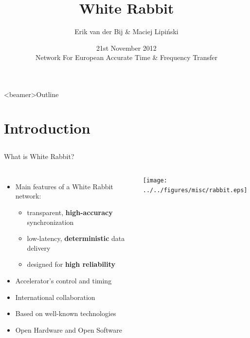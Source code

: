 \documentclass[compress,red]{beamer}
\title[White Rabbit \hspace{2em}\insertframenumber/\inserttotalframenumber]
{White Rabbit}
\institute{
   \begin{center}
    Hardware and Timing Section  \\
    CERN\\
   \end{center}
}
\author{
Erik van der Bij \& Maciej Lipi\'{n}ski \\
}
\date{21st November 2012 \\ Network For European Accurate Time \& Frequency Transfer}
\begin{document}
\frame{\titlepage}
\begin{frame}<beamer>{Outline}
    \tableofcontents %
\end{frame}

\section{Introduction}
\subsection{}
\begin{frame}{What is White Rabbit?}

\begin{columns}[c]
	  \begin{itemize}
		\item Main features of a White Rabbit network:
		\begin{itemize}
		  \item transparent,  {\bf high-accuracy} synchronization
		  \item low-latency,  {\bf deterministic} data delivery
		  \item designed for  {\bf high reliability}
		\end{itemize}
		\item Accelerator's control and timing
		\item International collaboration
		\item Based on well-known technologies
		\item Open Hardware and Open Software

	  \end{itemize}
		\begin{center}
		\hspace{-0.5cm}
		\texttt{[image: ../../figures/misc/rabbit.eps]}
		\end{center}
	\end{columns}

\end{frame}
\end{document}
